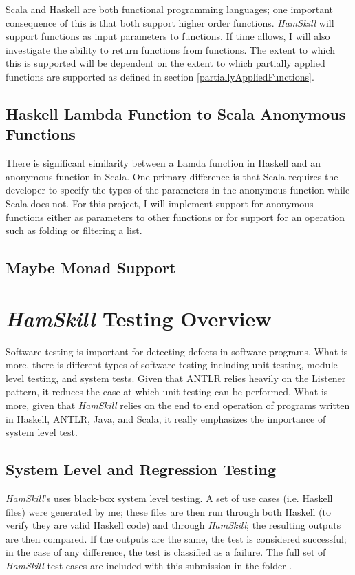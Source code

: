 \documentclass{report}
\begin{document}
Scala and Haskell are both functional programming languages; one important consequence of this is that both support higher order functions.  \emph{HamSkill} will support functions as input parameters to functions.  If time allows, I will also investigate the ability to return functions from functions.  The extent to which this is supported will be dependent on the extent to which partially applied functions are supported as defined in section \ref{partiallyAppliedFunctions}.

\subsection{Haskell Lambda Function to Scala Anonymous Functions}\label{sec:lambdaAnonymousFunctions}

There is significant similarity between a Lamda function in Haskell and an anonymous function in Scala.  One primary difference is that Scala requires the developer to specify the types of the parameters in the anonymous function while Scala does not. For this project, I will implement support for anonymous functions either as parameters to other functions or for support for an operation such as folding or filtering a list. 

\subsection{Maybe Monad Support}

\section{\textit{HamSkill} Testing Overview}

Software testing is important for detecting defects in software programs.  What is more, there is different types of software testing including unit testing, module level testing, and system tests.  Given that ANTLR relies heavily on the Listener pattern, it reduces the ease at which unit testing can be performed.  What is more, given that \textit{HamSkill} relies on the end to end operation of programs written in Haskell, ANTLR, Java, and Scala, it really emphasizes the importance of system level test.

\subsection{System Level and Regression Testing}

\textit{HamSkill}'s uses black-box system level testing.  A set of use cases (i.e. Haskell files) were generated by me; these files are then run through both Haskell (to verify they are valid Haskell code) and through \textit{HamSkill}; the resulting outputs are then compared.  If the outputs are the same, the test is considered successful; in the case of any difference, the test is classified as a failure.  The full set of \textit{HamSkill} test cases are included with this submission in the folder .
\end{document}
